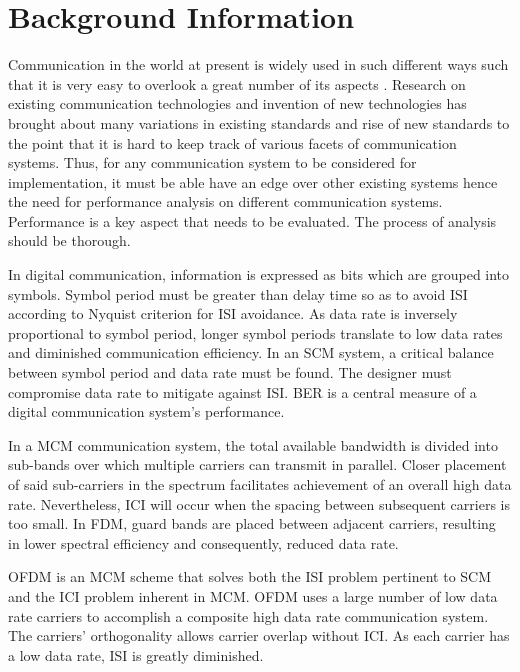 
\section{Background Information}
Communication in the world at present is widely used in such different ways such that it is very easy to overlook a great number of its aspects \cite{hayk}. Research on existing communication technologies and invention of new technologies has brought about many variations in existing standards and rise of new standards to the point that it is hard to keep track of various facets of communication systems. Thus, for any communication system to be considered for implementation, it must be able have an edge over other existing systems hence the need for performance analysis on different communication systems. Performance is a key aspect that needs to be evaluated.  The process of analysis should be thorough.%

In digital communication, information is expressed as bits\cite{ofdm_intro} which are grouped into \gls{symbol}s. Symbol period must be greater than delay time so as to avoid \gls{ISI} according to Nyquist criterion for \gls{ISI} avoidance\cite{ofdm_intro}. As data rate is inversely proportional to symbol period, longer symbol periods translate to low data rates and diminished communication efficiency. In an \gls{SCM} system, a critical balance between symbol period and data rate must be found. The designer must compromise data rate to mitigate against \gls{ISI}. \gls{BER} is a central measure of a digital communication system's performance.

In a \gls{MCM} communication system, the total available bandwidth is divided into sub-bands over which multiple carriers can transmit in parallel. Closer placement of said sub-carriers in the spectrum facilitates achievement of an overall high data rate. Nevertheless, \gls{ICI} will occur when the spacing between subsequent carriers is too small. In \gls{FDM}, guard bands are placed between adjacent carriers, resulting in lower spectral efficiency and consequently, reduced data rate.

\gls{OFDM} is an \gls{MCM} scheme that solves both the \gls{ISI} problem pertinent to \gls{SCM} and the \gls{ICI} problem inherent in \gls{MCM}\cite{ofdm_intro}. \gls{OFDM} uses a large number of low data rate carriers to accomplish a composite high data rate communication system. The carriers' \gls{orthogonal}ity allows carrier overlap without \gls{ICI}. As each carrier has a low data rate, \gls{ISI} is greatly diminished.

